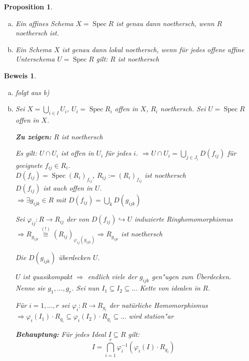 \documentclass[paper = A4, fontsize=12pt, numbers=noendperiod, chapterprefix=true]{scrbook}
\theoremstyle{break}
\newtheorem{Prop}[Def]{Proposition}
\theoremstyle{nonumberbreak}
\newtheorem{bew}{Beweis}
\theoremstyle{nonumberplain}
\DeclareMathOperator{\Spec}{Spec}
\begin{document}
\begin{Prop}\label{7.2}\begin{enumerate}[a)]
\item
	Ein affines Schema $X = \Spec R$ ist genau dann noethersch, wenn $R$ noethersch ist.
\item
	Ein Schema $X$ ist genau dann lokal noethersch, wenn f\"ur jedes offene affine Unterschema $U = \Spec R$ gilt: $R$ ist noethersch
\end{enumerate}\end{Prop}

\begin{bew}\begin{enumerate}[a)]
\item
	folgt aus b)
\item
	Sei $X = \bigcup\limits_{i \in I} U_i$, $U_i = \Spec R_i$ offen in $X$, $R_i$ noethersch. Sei $U = \Spec R$ offen in $X$.
	
	\textbf{Zu zeigen:} $R$ ist noethersch
	
	Es gilt: $U \cap U_i$ ist offen in $U_i$ f\"ur jedes $i$. $\Rightarrow U \cap U_i = \bigcup\limits_{j \in J_i} D(f_{ij})$ f\"ur geeignete $f_{ij} \in R_i$.\\
	$D(f_{ij}) = \Spec (R_i)_{f_{ij}}$, $R_{ij} := (R_i)_{f_{ij}}$ ist noethersch\\
	$D(f_{ij})$ ist auch offen in $U$.\\
	$\Rightarrow \exists g_{ijk} \in R$ mit $D(f_{ij}) = \bigcup\limits_k D(g_{ijk})$
	
	Sei $\varphi_{ij}: R \to R_{ij}$ der von $D(f_{ij}) \hookrightarrow U$ induzierte Ringhomomorphismus\\
	$\Rightarrow R_{g_{ijk}} \overset{(!)}{\cong} (R_{ij})_{\varphi_{ij}(g_{ijk})} \Rightarrow R_{g_{ijk}}$ ist noethersch
	
	Die $D(g_{ijk})$ \"uberdecken $U$.
	
	$U$ ist quasikompakt $\Rightarrow $ endlich viele der $g_{ijk}$ gen"ugen zum \"Uberdecken. Nenne sie $g_1, \ldots, g_r$. Sei nun $I_1 \subseteq I_2 \subseteq \ldots $ Kette von idealen in $R$.
	
	F\"ur $i=1,\ldots ,r$ sei $\varphi_i: R \to R_{g_i}$ der nat\"urliche Homomorphismus $\Rightarrow \varphi_i(I_1) \cdot R_{g_i} \subseteq \varphi_i(I_2) \cdot R_{g_i} \subseteq \ldots$ wird station"ar
	
	\textbf{Behauptung:} F\"ur jedes Ideal $I \subseteq R$ gilt:
		\[ I = \bigcap_{i=1}^r \varphi_i^{-1} (\varphi_i(I) \cdot R_{g_i}) \]
	

\end{enumerate}
\end{bew}
\end{document}
